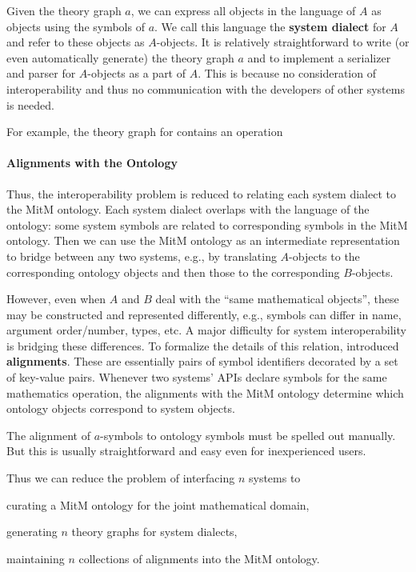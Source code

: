 Given the theory graph $a$, we can express all objects in the language of $A$ as \OMMT objects using the symbols of $a$.
We call this language the \textbf{\OMMT system dialect} for $A$ and refer to these objects as $A$-objects.
It is relatively straightforward to write (or even automatically generate) the theory graph $a$ and to implement a serializer and parser for $A$-objects as a part of $A$.
This is because no consideration of interoperability and thus no communication with the developers of other systems is needed.

For example, the theory graph for \GAP contains an operation

\paragraph{Alignments with the Ontology}
Thus, the interoperability problem is reduced to relating each system dialect to the MitM ontology.
Each system dialect overlaps with the language of the ontology: some system symbols are related to corresponding symbols in the MitM ontology.
Then we can use the MitM ontology as an intermediate representation to bridge between any two systems, e.g., by translating $A$-objects to the corresponding ontology objects and then those to the corresponding $B$-objects.

However, even when $A$ and $B$ deal with the ``same mathematical objects'', these may be constructed and represented differently, e.g., symbols can differ in name,
argument order/number, types, etc.
A major difficulty for system interoperability is bridging these differences.
To formalize the details of this relation, \cite{MueGauKal:cacfms17} introduced \textbf{\OMMT alignments}.
These are essentially pairs of \OMMT symbol identifiers decorated by a set of key-value pairs.
Whenever two systems' APIs declare symbols for the same mathematics operation, the alignments with the MitM ontology determine which ontology objects correspond to system objects.

The alignment of $a$-symbols to ontology symbols must be spelled out manually.
But this is usually straightforward and easy even for inexperienced users.

Thus we can reduce the problem of interfacing $n$ systems to
\begin{inparaenum}[\em i\rm)]
\item curating a MitM ontology for the joint mathematical domain,
\item generating $n$ theory graphs for system dialects,
\item maintaining $n$ collections of alignments into the MitM ontology.
\end{inparaenum}


